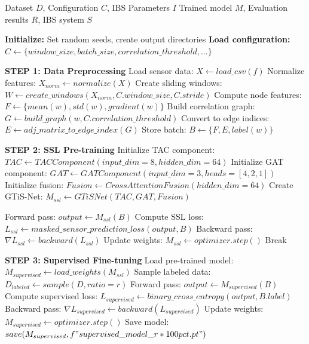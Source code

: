 \documentclass[conference]{IEEEtran}
\begin{document}
\begin{algorithm}[H]
\caption{GTiS-Net Complete Workflow with IBS Integration}
\begin{algorithmic}[1]
\REQUIRE Dataset $D$, Configuration $C$, IBS Parameters $I$
\ENSURE Trained model $M$, Evaluation results $R$, IBS system $S$

\STATE \textbf{Initialize:} Set random seeds, create output directories
\STATE \textbf{Load configuration:} $C \leftarrow \{window\_size, batch\_size, correlation\_threshold, \ldots\}$

\STATE \textbf{STEP 1: Data Preprocessing}
    \STATE Load sensor data: $X \leftarrow load\_csv(f)$
    \STATE Normalize features: $X_{norm} \leftarrow normalize(X)$
    \STATE Create sliding windows: $W \leftarrow create\_windows(X_{norm}, C.window\_size, C.stride)$
        \STATE Compute node features: $F \leftarrow \{mean(w), std(w), gradient(w)\}$
        \STATE Build correlation graph: $G \leftarrow build\_graph(w, C.correlation\_threshold)$
        \STATE Convert to edge indices: $E \leftarrow adj\_matrix\_to\_edge\_index(G)$
        \STATE Store batch: $B \leftarrow \{F, E, label(w)\}$
    \ENDFOR
\ENDFOR

\STATE \textbf{STEP 2: SSL Pre-training}
\STATE Initialize TAC component: $TAC \leftarrow TACComponent(input\_dim=8, hidden\_dim=64)$
\STATE Initialize GAT component: $GAT \leftarrow GATComponent(input\_dim=3, heads=[4,2,1])$
\STATE Initialize fusion: $Fusion \leftarrow CrossAttentionFusion(hidden\_dim=64)$
\STATE Create GTiS-Net: $M_{ssl} \leftarrow GTiSNet(TAC, GAT, Fusion)$

        \STATE Forward pass: $output \leftarrow M_{ssl}(B)$
        \STATE Compute SSL loss: $L_{ssl} \leftarrow masked\_sensor\_prediction\_loss(output, B)$
        \STATE Backward pass: $\nabla L_{ssl} \leftarrow backward(L_{ssl})$
        \STATE Update weights: $M_{ssl} \leftarrow optimizer.step()$
    \ENDFOR
        \STATE Break
    \ENDIF
\ENDFOR

\STATE \textbf{STEP 3: Supervised Fine-tuning}
    \STATE Load pre-trained model: $M_{supervised} \leftarrow load\_weights(M_{ssl})$
    \STATE Sample labeled data: $D_{labeled} \leftarrow sample(D, ratio=r)$
            \STATE Forward pass: $output \leftarrow M_{supervised}(B)$
            \STATE Compute supervised loss: $L_{supervised} \leftarrow binary\_cross\_entropy(output, B.label)$
            \STATE Backward pass: $\nabla L_{supervised} \leftarrow backward(L_{supervised})$
            \STATE Update weights: $M_{supervised} \leftarrow optimizer.step()$
        \ENDFOR
    \ENDFOR
    \STATE Save model: $save(M_{supervised}, f"supervised\_model\_{r*100}pct.pt")$
\ENDFOR


\end{algorithmic}
\end{algorithm}
\end{document}
